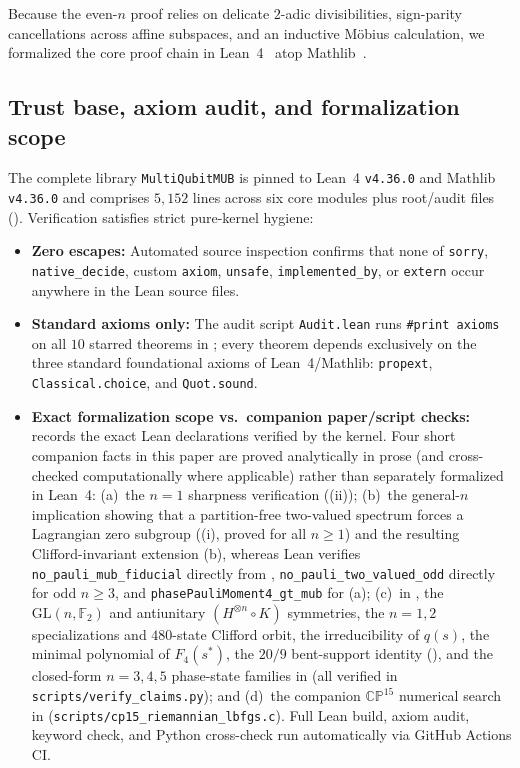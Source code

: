 \documentclass[11pt,a4paper]{article}
\theoremstyle{plain}
\theoremstyle{definition}
\theoremstyle{remark}
\newcommand{\F}{\mathbb{F}}
\newcommand{\CP}{\mathbb{CP}}
\newcommand{\GL}{\mathrm{GL}}
\newcommand{\lean}[1]{\texttt{\small #1}}
\numberwithin{equation}{section}
\begin{document}
Because the even-$n$ proof relies on delicate $2$-adic divisibilities, sign-parity cancellations across affine subspaces, and an inductive M\"obius calculation, we formalized the core proof chain in Lean~4~\cite{demoura2021lean4} atop Mathlib~\cite{mathlib2020lean}.

\subsection{Trust base, axiom audit, and formalization scope}

The complete library \texttt{MultiQubitMUB} is pinned to Lean~4 \texttt{v4.36.0} and Mathlib \texttt{v4.36.0} and comprises $5{,}152$ lines across six core modules plus root/audit files (). Verification satisfies strict pure-kernel hygiene:
\begin{itemize}[leftmargin=1.8em]
  \item \textbf{Zero escapes:} Automated source inspection confirms that none of \lean{sorry}, \lean{native\_decide}, custom \lean{axiom}, \lean{unsafe}, \lean{implemented\_by}, or \lean{extern} occur anywhere in the Lean source files.
  \item \textbf{Standard axioms only:} The audit script \lean{Audit.lean} runs \lean{\#print axioms} on all $10$ starred theorems in ; every theorem depends exclusively on the three standard foundational axioms of Lean~4/Mathlib: \lean{propext}, \lean{Classical.choice}, and \lean{Quot.sound}.
  \item \textbf{Exact formalization scope vs.\ companion paper/script checks:}  records the exact Lean declarations verified by the kernel. Four short companion facts in this paper are proved analytically in prose (and cross-checked computationally where applicable) rather than separately formalized in Lean~4: (a)~the $n = 1$ sharpness verification ((ii)); (b)~the general-$n$ implication showing that a partition-free two-valued spectrum forces a Lagrangian zero subgroup ((i), proved for all $n \ge 1$) and the resulting Clifford-invariant extension (b), whereas Lean verifies \lean{no\_pauli\_\allowbreak mub\_fiducial} directly from , \lean{no\_pauli\_two\_\allowbreak valued\_odd} directly for odd $n \ge 3$, and \lean{phasePauliMoment4\_\allowbreak gt\_mub} for (a); (c)~in , the $\GL(n,\F_2)$ and antiunitary $(H^{\otimes n}\circ K)$ symmetries, the $n = 1, 2$ specializations and $480$-state Clifford orbit, the irreducibility of $q(s)$, the minimal polynomial of $F_4(s^*)$, the $20/9$ bent-support identity (), and the closed-form $n = 3, 4, 5$ phase-state families in  (all verified in \texttt{\small scripts/\allowbreak verify\_claims.py}); and (d)~the companion $\CP^{15}$ numerical search in  (\texttt{\small scripts/\allowbreak cp15\_\allowbreak riemannian\_\allowbreak lbfgs.c}). Full Lean build, axiom audit, keyword check, and Python cross-check run automatically via GitHub Actions CI.
\end{itemize}
\end{document}
